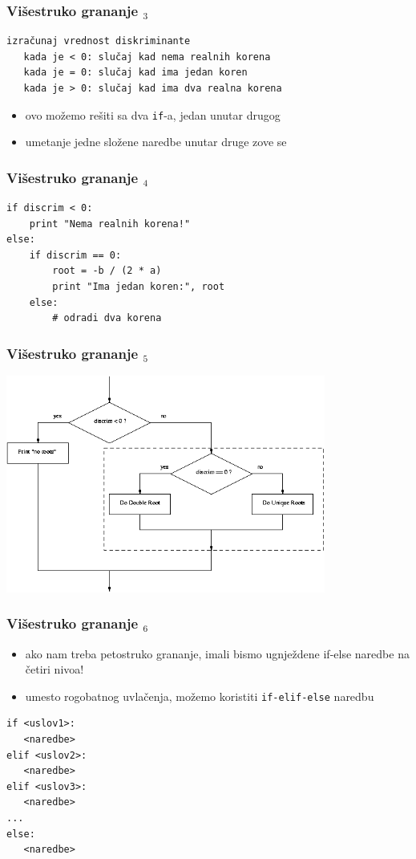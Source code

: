 \documentclass[utf8,compress]{beamer}
\begin{document}
\begin{frame}[fragile]
  \frametitle{Višestruko grananje $_3$}
\begin{verbatim}
izračunaj vrednost diskriminante
   kada je < 0: slučaj kad nema realnih korena
   kada je = 0: slučaj kad ima jedan koren
   kada je > 0: slučaj kad ima dva realna korena
\end{verbatim}
  \begin{itemize}
    \item ovo možemo rešiti sa dva \texttt{if}-a, jedan unutar drugog
    \item umetanje jedne složene naredbe unutar druge zove se 
  \end{itemize}
\end{frame}

\begin{frame}[fragile]
  \frametitle{Višestruko grananje $_4$}
\begin{verbatim}
if discrim < 0:
    print "Nema realnih korena!"
else:
    if discrim == 0:
        root = -b / (2 * a)
        print "Ima jedan koren:", root
    else:
        # odradi dva korena
\end{verbatim}
\end{frame}

\begin{frame}[fragile]
  \frametitle{Višestruko grananje $_5$}
\begin{center}
  \includegraphics[width=10.5cm]{pic16}
\end{center}
\end{frame}

\begin{frame}[fragile]
  \frametitle{Višestruko grananje $_6$}
  \begin{itemize}
    \item ako nam treba petostruko grananje, imali bismo ugnježdene if-else naredbe na četiri nivoa!
    \item umesto rogobatnog uvlačenja, možemo koristiti \texttt{if-elif-else} naredbu
  \end{itemize}
\begin{verbatim}
if <uslov1>:
   <naredbe>
elif <uslov2>:
   <naredbe>
elif <uslov3>:
   <naredbe>
...
else:
   <naredbe>
\end{verbatim}
\end{frame}
\end{document}
